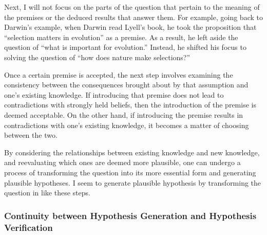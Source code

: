 Next, I will not focus on the parts of the question that pertain to the meaning of the premises or the deduced results that answer them. For example, going back to Darwin's example, when Darwin read Lyell's book, he took the proposition that ``selection matters in evolution'' as a premise. As a result, he left aside the question of ``what is important for evolution.'' Instead, he shifted his focus to solving the question of ``how does nature make selections?''

Once a certain premise is accepted, the next step involves examining the consistency between the consequences brought about by that assumption and one's existing knowledge. If introducing that premise does not lead to contradictions with strongly held beliefs, then the introduction of the premise is deemed acceptable. On the other hand, if introducing the premise results in contradictions with one's existing knowledge, it becomes a matter of choosing between the two. 



By considering the relationships between existing knowledge and new knowledge, and reevaluating which ones are deemed more plausible, one can undergo a process of transforming the question into its more essential form and generating plausible hypotheses. I seem to generate plausible hypothesis by transforming the question in like these steps.

\subsubsection{Continuity between Hypothesis Generation and Hypothesis Verification}

